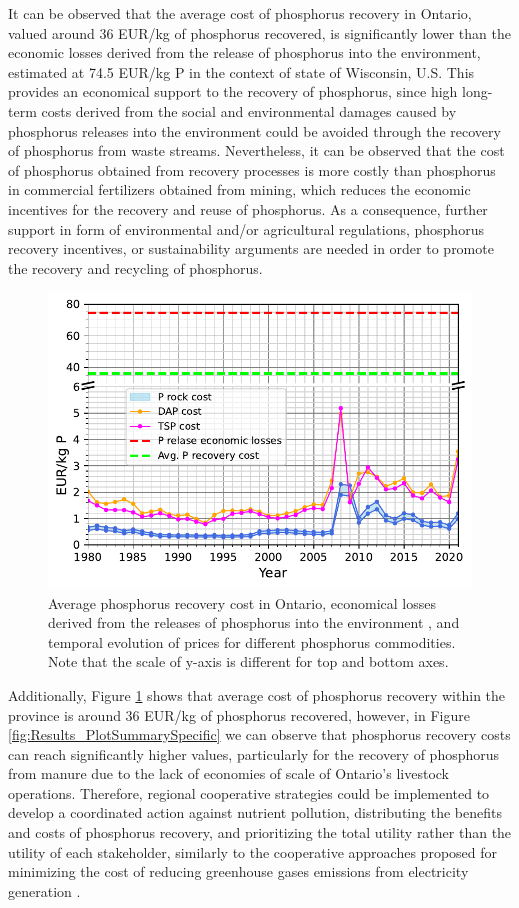 \documentclass[]{elsarticle}
\begin{document}
It can be observed that the average cost of phosphorus recovery in Ontario, valued around 36 EUR/kg of phosphorus recovered, is significantly lower than the economic losses derived from the release of phosphorus into the environment, estimated at 74.5 EUR/kg P in the context of state of Wisconsin, U.S. This provides an economical support to the recovery of phosphorus, since high long-term costs derived from the social and environmental damages caused by phosphorus releases into the environment could be avoided through the recovery of phosphorus from waste streams. Nevertheless, it can be observed that the cost of phosphorus obtained from recovery processes is more costly than phosphorus in commercial fertilizers obtained from mining, which reduces the economic incentives for the recovery and reuse of phosphorus. As a consequence, further support in form of environmental and/or agricultural regulations, phosphorus recovery incentives, or sustainability arguments are needed in order to promote the recovery and recycling of phosphorus.

\begin{figure}[H]
	\centering
	\includegraphics[width=0.75\linewidth, trim={0cm 0cm 0cm 0cm},clip]{Figures/CommodityPrices.pdf} 
	\caption{Average phosphorus recovery cost in Ontario, economical losses derived from the releases of phosphorus into the environment \protect\citep{sampat2021valuing}, and temporal evolution of prices for different phosphorus commodities. Note that the scale of y-axis is different for top and bottom axes.}
	\label{fig:CommodityPrices}
\end{figure}

Additionally, Figure \ref{fig:CommodityPrices} shows that average cost of phosphorus recovery within the province is around 36 EUR/kg of phosphorus recovered, however, in Figure \ref{fig:Results_PlotSummarySpecific} we can observe that phosphorus recovery costs can reach significantly higher values, particularly for the recovery of phosphorus from manure due to the lack of economies of scale of Ontario's livestock operations. Therefore, regional cooperative strategies could be implemented to develop a coordinated action against nutrient pollution, distributing the benefits and costs of phosphorus recovery, and prioritizing the total utility rather than the utility of each stakeholder, similarly to the cooperative approaches proposed for minimizing the cost of reducing greenhouse gases emissions from electricity generation \citep{galan2018time}.
\end{document}
